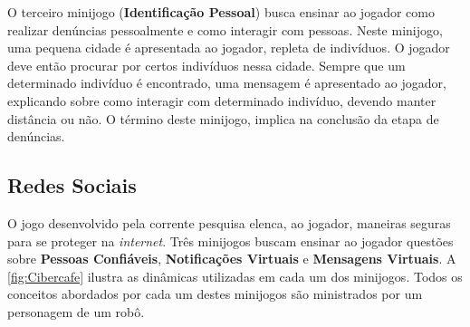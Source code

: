 O terceiro minijogo (\textbf{Identificação Pessoal}) busca ensinar ao jogador como realizar denúncias pessoalmente e como interagir com pessoas. Neste minijogo, uma pequena cidade é apresentada ao jogador, repleta de indivíduos. O jogador deve então procurar por certos indivíduos nessa cidade. Sempre que um determinado indivíduo é encontrado, uma mensagem é apresentado ao jogador, explicando sobre como interagir com determinado indivíduo, devendo manter distância ou não. O término deste minijogo, implica na conclusão da etapa de denúncias. 


\subsection{Redes Sociais}\label{subsec:4}

O jogo desenvolvido pela corrente pesquisa elenca, ao jogador, maneiras seguras para se proteger na \textit{internet}. Três minijogos buscam ensinar ao jogador questões sobre \textbf{Pessoas Confiáveis}, \textbf{Notificações Virtuais} e \textbf{Mensagens Virtuais}. A \autoref{fig:Cibercafe} ilustra as dinâmicas utilizadas em cada um dos minijogos. Todos os conceitos abordados por cada um destes minijogos são ministrados por um personagem de um robô. 


